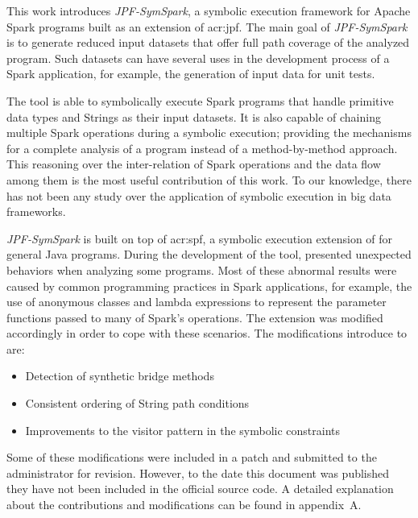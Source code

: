 \label{sec:contributions}

This work introduces \textit{JPF-SymSpark}, a symbolic execution framework for Apache Spark programs built as an extension of \acrfull{acr:jpf}. The main goal of \textit{JPF-SymSpark} is to generate reduced input datasets that offer full path coverage of the analyzed program. Such datasets can have several uses in the development process of a Spark application, for example, the generation of input data for unit tests.

The tool is able to symbolically execute Spark programs that handle primitive data types and Strings as their input datasets. It is also capable of chaining multiple Spark operations during a symbolic execution; providing the mechanisms for a complete analysis of a program instead of a method-by-method approach. This reasoning over the inter-relation of Spark operations and the data flow among them is the most useful contribution of this work. To our knowledge, there has not been any study over the application of symbolic execution in big data frameworks.

\textit{JPF-SymSpark} is built on top of \acrfull{acr:spf}, a symbolic execution extension of \jpf{} for general Java programs. During the development of the tool, \spf{} presented unexpected behaviors when analyzing some programs. Most of these abnormal results were caused by common programming practices in Spark applications, for example, the use of anonymous classes and lambda expressions to represent the parameter functions passed to many of Spark's operations. The \spf{} extension was modified accordingly in order to cope with these scenarios. The modifications introduce to \spf{} are:

\begin{itemize}
	\item Detection of synthetic bridge methods
	\item Consistent ordering of String path conditions
	\item Improvements to the visitor pattern in the symbolic constraints
\end{itemize}

Some of these modifications were included in a patch and submitted to the \spf{} administrator for revision. However, to the date this document was published they have not been included in the official source code. A detailed explanation about the contributions and modifications can be found in appendix~A.


